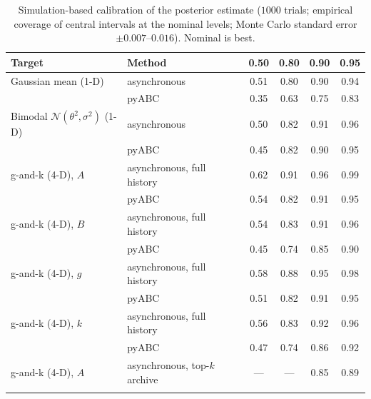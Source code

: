 \documentclass[pdflatex,sn-mathphys-num]{sn-jnl}
\theoremstyle{plain}
\theoremstyle{definition}
\begin{document}
\begin{table}[t]
\caption{Simulation-based calibration of the posterior estimate ($1000$ trials; empirical coverage of central intervals at the nominal levels; Monte Carlo standard error ${\pm}0.007$--$0.016$). Nominal is best.}\label{tab:sbc}
\centering
\begin{tabular}{@{}llcccc@{}}
\toprule
Target & Method & 0.50 & 0.80 & 0.90 & 0.95 \\
\midrule
Gaussian mean (1-D)     & asynchronous & 0.51 & 0.80 & 0.90 & 0.94 \\
                        & pyABC & 0.35 & 0.63 & 0.75 & 0.83 \\
Bimodal $\mathcal N(\theta^2,\sigma^2)$ (1-D) & asynchronous & 0.50 & 0.82 & 0.91 & 0.96 \\
                        & pyABC & 0.45 & 0.82 & 0.90 & 0.95 \\
g-and-k (4-D), $A$      & asynchronous, full history & 0.62 & 0.91 & 0.96 & 0.99 \\
                        & pyABC & 0.54 & 0.82 & 0.91 & 0.95 \\
g-and-k (4-D), $B$      & asynchronous, full history & 0.54 & 0.83 & 0.91 & 0.96 \\
                        & pyABC & 0.45 & 0.74 & 0.85 & 0.90 \\
g-and-k (4-D), $g$      & asynchronous, full history & 0.58 & 0.88 & 0.95 & 0.98 \\
                        & pyABC & 0.51 & 0.82 & 0.91 & 0.95 \\
g-and-k (4-D), $k$      & asynchronous, full history & 0.56 & 0.83 & 0.92 & 0.96 \\
                        & pyABC & 0.47 & 0.74 & 0.86 & 0.92 \\
g-and-k (4-D), $A$      & asynchronous, top-$k$ archive & --- & --- & 0.85 & 0.89 \\
\botrule
\end{tabular}
\end{table}
\end{document}
